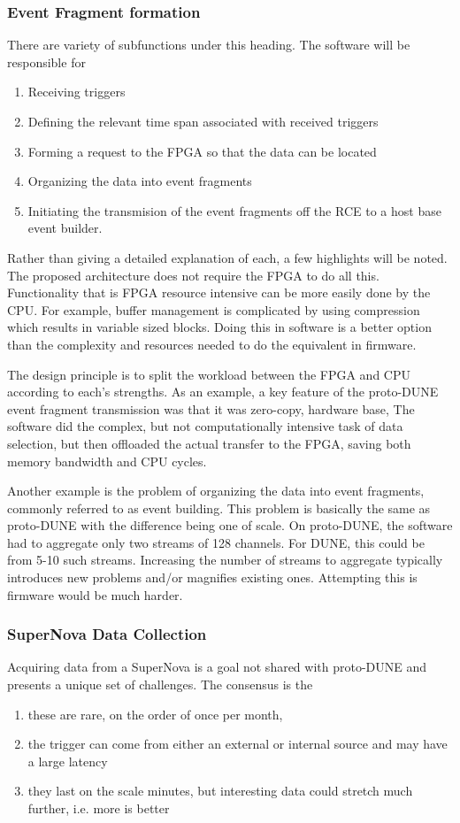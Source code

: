 \subsubsection{Event Fragment formation}
There are variety of subfunctions under this heading.  The software will be responsible for
\begin{enumerate}
    \item Receiving triggers
    \item Defining the relevant time span associated with received triggers
    \item Forming a request to the FPGA so that the data can be located
    \item Organizing the data into event fragments
    \item Initiating the transmision of the event fragments off the RCE to a host base event builder.
\end{enumerate}

Rather than giving a detailed explanation of each, a few highlights will be noted.  The proposed architecture does not require the FPGA to do all this. Functionality that is FPGA resource intensive can be more easily done by the CPU. For example, buffer management is complicated by using compression which results in variable sized blocks.  Doing this in software is a better option than the complexity and resources needed to do the equivalent in firmware.

The design principle is to split the workload between the FPGA and CPU according to each's strengths.  As an example, a key feature of the proto-DUNE event fragment transmission was that it was zero-copy, hardware base, The software did the complex, but not computationally intensive task of data selection, but then offloaded the actual transfer to the FPGA, saving both memory bandwidth and CPU cycles.

Another example is the problem of organizing the data into event fragments, commonly referred to as event building. This problem is basically the same as proto-DUNE with the difference being one of scale. On proto-DUNE, the software had to aggregate only two streams of 128 channels.  For DUNE, this could be from 5-10 such streams. Increasing the number of streams to aggregate typically introduces new problems and/or magnifies existing ones.  Attempting this is firmware would be much harder.

\subsubsection{SuperNova Data Collection}
Acquiring data from a SuperNova is a goal not shared with proto-DUNE and presents a unique set of challenges.  The consensus is the 
\begin{enumerate}
   \item these are rare, on the order of once per month, 
   \item the trigger can come from either an external or internal source and may have a large latency
   \item they last on the scale minutes, but interesting data could stretch much further, i.e. more is better
\end{enumerate}

